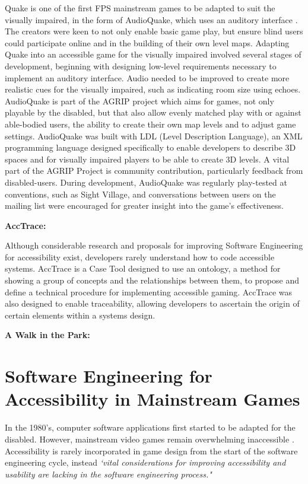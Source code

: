 \documentclass{scrartcl}
\begin{document}
Quake \cite{4} is one of the first FPS mainstream games to be adapted to suit the visually impaired, in the form of AudioQuake, which uses an auditory interface \cite{5}. The creators were keen to not only enable basic game play, but ensure blind users could participate online and in the building of their own level maps. Adapting Quake into an accessible game for the visually impaired involved several stages of development, beginning with designing low-level requirements necessary to implement an auditory interface. Audio needed to be improved to create more realistic cues for the visually impaired, such as indicating room size using echoes. AudioQuake is part of the AGRIP project \cite{6} which aims for games, not only playable by the disabled, but that also allow evenly matched play with or against able-bodied users, the ability to create their own map levels and to adjust game settings. AudioQuake was built with LDL (Level Description Language), an XML programming language designed specifically to enable developers to describe 3D spaces and for visually impaired players to be able to create 3D levels. A vital part of the AGRIP Project is community contribution, particularly feedback from disabled-users. During development, AudioQuake was regularly play-tested at conventions, such as Sight Village, and conversations between users on the mailing list were encouraged for greater insight into the game's effectiveness.

\textbf{AccTrace:}

Although considerable research and proposals for improving Software Engineering for accessibility exist, developers rarely understand how to code accessible systems. AccTrace \cite{12} is a Case Tool designed to use an ontology, a method for showing a group of concepts and the relationships between them, to propose and define a technical procedure for implementing accessible gaming. AccTrace was also designed to enable traceability, allowing developers to ascertain the origin of certain elements within a systems design. \cite{12}

\textbf{A Walk in the Park:}

\section{Software Engineering for Accessibility in Mainstream Games}
In the  1980's, computer software applications first started to be adapted for the disabled. However, mainstream video games remain overwhelming inaccessible \cite{13}. Accessibility is rarely incorporated in game design from the start of the software engineering cycle, instead \textit{`vital considerations for improving accessibility and usability are lacking in the software engineering process."} \cite{15}
\end{document}
